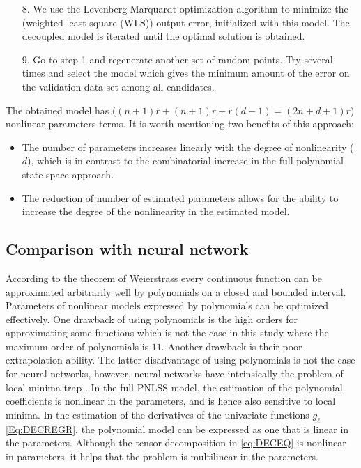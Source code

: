 \documentclass[review]{elsarticle}
\begin{document}
\begin{itemize}
\item[8.] We use the Levenberg-Marquardt optimization algorithm to minimize the (weighted least square (WLS)) output error, initialized with this model. The decoupled model is iterated until the optimal solution is obtained.
\item[9.] Go to step 1 and regenerate another set of random points. Try several times and select the model which gives the minimum amount of the error on the validation data set among all candidates.
\end{itemize}

The obtained model has ($(n+1) r + (n+1) r + r  (d-1) = (2n+d+1) r$) nonlinear parameters terms. 
It is worth mentioning two benefits of this approach:
\begin{itemize}
\item The number of parameters increases linearly with the degree of nonlinearity ($d$), which is in contrast to the combinatorial increase in the full polynomial state-space approach.
\item The reduction of number of estimated parameters allows for the ability to increase the degree of the nonlinearity in the estimated model.
\end{itemize}

\subsection{Comparison with neural network}
According to the theorem of Weierstrass \citep{jeffreys1956methods} every continuous function can be approximated arbitrarily well by polynomials on a closed and bounded interval. 
Parameters of nonlinear models expressed by polynomials can be optimized effectively. 
One drawback of using polynomials is the high orders for approximating some functions which is not the case in this study where the maximum order of polynomials is $11$. Another drawback is their poor extrapolation ability. 
The latter disadvantage of using polynomials is not the case for neural networks, however, neural networks have intrinsically the problem of local minima trap \citep{janczak2004identification}. In the full PNLSS model, the estimation of the polynomial coefficients is nonlinear in the parameters, and is hence also sensitive to local minima. In the estimation of the derivatives of the univariate functions $g_\ell$ \eqref{Eq:DECREGR}, the polynomial model can be expressed as one that is linear in the parameters. Although the tensor decomposition in \eqref{eq:DECEQ} is nonlinear in parameters, it helps that the problem is multilinear in the parameters.
\end{document}

